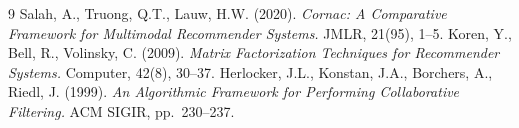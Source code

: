 \documentclass[11pt,a4paper]{article}
\begin{document}
\vspace{0.2cm}
\begin{thebibliography}{9}
\setlength{\itemsep}{1pt}
  Salah, A., Truong, Q.T., Lauw, H.W. (2020).
  \textit{Cornac: A Comparative Framework for Multimodal Recommender Systems.}
  JMLR, 21(95), 1--5.
  Koren, Y., Bell, R., Volinsky, C. (2009).
  \textit{Matrix Factorization Techniques for Recommender Systems.}
  Computer, 42(8), 30--37.
  Herlocker, J.L., Konstan, J.A., Borchers, A., Riedl, J. (1999).
  \textit{An Algorithmic Framework for Performing Collaborative Filtering.}
  ACM SIGIR, pp.\ 230--237.
\end{thebibliography}
\end{document}

